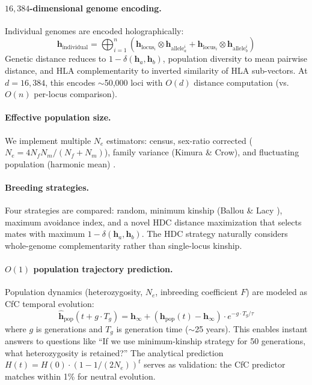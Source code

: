 \documentclass[11pt,letterpaper]{article}
\newcommand{\hv}{\mathbf{h}}
\newcommand{\bind}{\otimes}
\newcommand{\similar}{\delta}
\newcommand{\dimHDC}{16{,}384}
\begin{document}
\paragraph{$\dimHDC$-dimensional genome encoding.} Individual genomes are encoded
holographically:
\begin{equation}
\hv_\text{individual} = \bigoplus_{i=1}^{n} \left( \hv_{\text{locus}_i} \bind \hv_{\text{allele}_a^i} + \hv_{\text{locus}_i} \bind \hv_{\text{allele}_b^i} \right)
\label{eq:genome}
\end{equation}
Genetic distance reduces to $1 - \similar(\hv_a, \hv_b)$, population diversity
to mean pairwise distance, and HLA complementarity to inverted similarity of
HLA sub-vectors. At $d = \dimHDC$, this encodes $\sim$50,000 loci with $O(d)$
distance computation (vs. $O(n)$ per-locus comparison).

\paragraph{Effective population size.} We implement multiple $N_e$ estimators:
census, sex-ratio corrected ($N_e = 4N_fN_m/(N_f + N_m)$), family variance
(Kimura \& Crow), and fluctuating population (harmonic mean)
\cite{frankham2010introduction,reed2005estimates}.

\paragraph{Breeding strategies.} Four strategies are compared: random,
minimum kinship (Ballou \& Lacy \cite{ballou1995population}), maximum avoidance
index, and a novel HDC distance maximization that selects mates with maximum
$1 - \similar(\hv_a, \hv_b)$. The HDC strategy naturally considers whole-genome
complementarity rather than single-locus kinship.

\paragraph{$O(1)$ population trajectory prediction.} Population dynamics
(heterozygosity, $N_e$, inbreeding coefficient $F$) are modeled as CfC
temporal evolution:
\begin{equation}
\hat{\hv}_\text{pop}(t + g \cdot T_g) = \hv_\infty + (\hv_\text{pop}(t) - \hv_\infty) \cdot e^{-g \cdot T_g / \tau}
\label{eq:poppredict}
\end{equation}
where $g$ is generations and $T_g$ is generation time ($\sim$25 years). This
enables instant answers to questions like ``If we use minimum-kinship strategy
for 50 generations, what heterozygosity is retained?'' The analytical prediction
$H(t) = H(0) \cdot (1 - 1/(2N_e))^t$ \cite{frankham2010introduction} serves as
validation: the CfC predictor matches within 1\% for neutral evolution.
\end{document}

